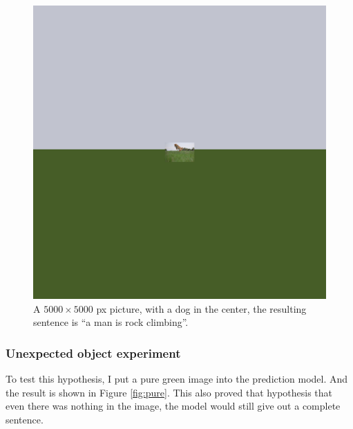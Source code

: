\documentclass[10pt,twocolumn,letterpaper]{article}
\begin{document}
\begin{figure}[t]
    \begin{center}
        \includegraphics[width=0.9\linewidth]{2584487952_f70e5aa9bf.jpg}
    \end{center}
    \caption{A $5000 \times 5000$ px picture, with a dog in the center, the resulting sentence is ``a man is rock climbing''.}
    \label{fig:hs}
\end{figure}

\subsubsection{Unexpected object experiment} \label{sec:uo}
To test this hypothesis, I put a pure green image into the prediction model.
And the result is shown in Figure \ref{fig:pure}.
This also proved that hypothesis that even there was nothing in the image, the model would still give out a complete sentence.
\end{document}
